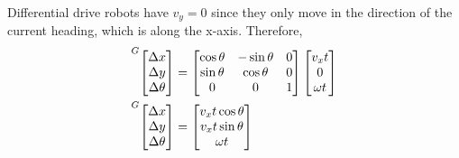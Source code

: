 Differential drive robots have $v_y = 0$ since they only move in the direction
of the current heading, which is along the x-axis. Therefore,
\begin{align*}
  \prescript{G}{}{\begin{bmatrix}
    \Delta x \\
    \Delta y \\
    \Delta \theta
  \end{bmatrix}} &=
  \begin{bmatrix}
    \cos\theta & -\sin\theta & 0 \\
    \sin\theta &  \cos\theta & 0 \\
             0 &           0 & 1
  \end{bmatrix}
  \begin{bmatrix}
    v_x t \\
    0 \\
    \omega t
  \end{bmatrix} \\
  \prescript{G}{}{\begin{bmatrix}
    \Delta x \\
    \Delta y \\
    \Delta \theta
  \end{bmatrix}} &=
  \begin{bmatrix}
    v_x t \cos\theta \\
    v_x t \sin\theta \\
    \omega t
  \end{bmatrix}
\end{align*}
